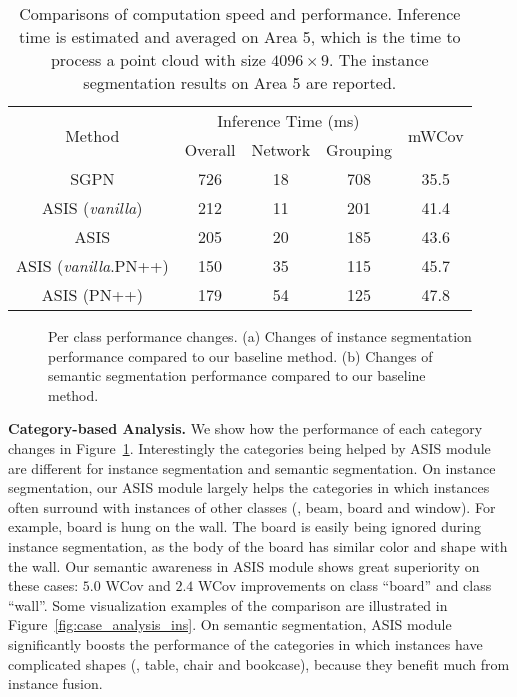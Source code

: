 \documentclass[10pt,twocolumn,letterpaper]{article}
\newcommand{\myparagraph}[1]{{\vspace{0.5em} \noindent \bf #1}}
\begin{document}
\begin{table}[!ht]
\small 
\begin{center}
\setlength{\tabcolsep}{3.8pt}
\begin{tabular}{c|c|cc|c}
\hline
\hline
 \multirow{2}{*}{Method}      &   \multicolumn{3}{c|}{Inference Time (ms)} &  \multirow{2}{*}{mWCov}\\
\cline{2-4}
 & Overall & Network & Grouping & \\
\hline
SGPN       & 726  & 18  & 708  & 35.5   \\
ASIS (\textit{vanilla})  & 212 & 11 & 201 & 41.4 \\
ASIS      & 205 & 20 & 185 & 43.6 \\
\hline
ASIS (\textit{vanilla}.PN++)  &  150 & 35 & 115 & 45.7 \\
ASIS (PN++)  & 179 & 54 & 125 &  47.8 \\

\hline
\end{tabular}
\end{center}
\vspace{-0.3cm}
\caption{Comparisons of computation speed and performance. Inference time is estimated and averaged on Area 5, which is the time to process a point cloud with size $4096 \times 9$. The instance segmentation results on Area 5 are reported. }
\label{tab:s3dis_efficiency}
\vspace{-0.2cm}
\end{table}


\begin{figure}[htbp]
\centering
{}
\vspace{-0.1cm}
\caption{Per class performance changes. (a) Changes of instance segmentation performance compared to our baseline method. (b) Changes of semantic segmentation performance compared to our baseline method.}
\label{fig:percate}
\vspace{-0.2cm}
\end{figure}

\myparagraph{Category-based Analysis.}
We show how the performance of each category changes in Figure~\ref{fig:percate}.
Interestingly the categories being helped by ASIS module are different for instance segmentation and semantic segmentation.
On instance segmentation, our ASIS module largely helps the categories in which  instances often surround with instances of other classes (\eg, beam, board and window). 
For example, board is hung on the wall.
The board is easily being ignored during instance segmentation, as the body of the board has similar color and shape with the wall.
Our semantic awareness in ASIS module shows great superiority on these cases: $5.0$ WCov and $2.4$ WCov improvements on class ``board'' and class ``wall''.  
Some visualization examples of the comparison are illustrated in Figure~\ref{fig:case_analysis_ins}.
On semantic segmentation, ASIS module significantly boosts the performance of the categories in which instances have complicated shapes (\eg, table, chair and bookcase), because they benefit much from instance fusion.
\end{document}
